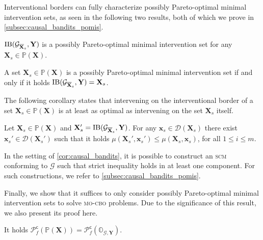 Interventional borders can fully characterize possibly Pareto-optimal minimal intervention sets, as seen in the following two results, both of which we prove in \cref{subsec:causal_bandits_pomis}.

\begin{proposition}
\label{prop:causal_bandits.intervenention_IB_pomis}
   $\textnormal{IB}(\mathcal{G}_{\overline{\mathbf{X}}_s}, \mathbf{Y})$ is a possibly Pareto-optimal minimal intervention set for any $\mathbf{X}_s \in \mathbb{P}(\mathbf{X})$.
\end{proposition}

\begin{theorem}\label{thm:causal_bandits}
    A set $\mathbf{X}_s \in \mathbb{P}(\mathbf{X})$ is a possibly Pareto-optimal minimal intervention set if and only if it holds $\textnormal{IB}(\mathcal{G}_{\overline{\mathbf{X}}_s}, \mathbf{Y}) = \mathbf{X}_s$.
\end{theorem}

The following corollary states that intervening on the interventional border of a set $\mathbf{X}_s \in \mathbb{P}(\mathbf{X})$ is at least as optimal as intervening on the set $\mathbf{X}_s$ itself.

\begin{corollary}\label{cor:causal_bandits}
    Let $\mathbf{X}_s \in \mathbb{P}(\mathbf{X})$ and $\mathbf{X}_s'=\textnormal{IB}(\mathcal{G}_{\overline{\mathbf{X}}_s}, \mathbf{Y})$. For any $\mathbf{x}_s \in \mathcal{D}(\mathbf{X}_s)$ there exist $\mathbf{x}_s' \in \mathcal{D}(\mathbf{X}_s')$ such that it holds $\mu(\mathbf{X}_s',\mathbf{x}_s') \leq \mu(\mathbf{X}_s,\mathbf{x}_s)$, for all $1\leq i \leq m$.
\end{corollary}

In the setting of \cref{cor:causal_bandits}, it is possible to construct an \textsc{scm} conforming to $\mathcal{G}$ such that strict inequality holds in at least one component. For such constructions, we refer to \cref{subsec:causal_bandits_pomis}. 

Finally, we show that it suffices to only consider possibly Pareto-optimal minimal intervention sets to solve \textsc{mo-cbo} problems. Due to the significance of this result, we also present its proof here.

\begin{proposition}\label{prop:pomis_suffice}
    It holds $\mathcal{P}_f^{\textsf{c}}(\mathbb{P}(\mathbf{X})) = \mathcal{P}_f^{\textsf{c}}(\mathbb{O}_{\mathcal{G},\mathbf{Y}})$.
\end{proposition}

